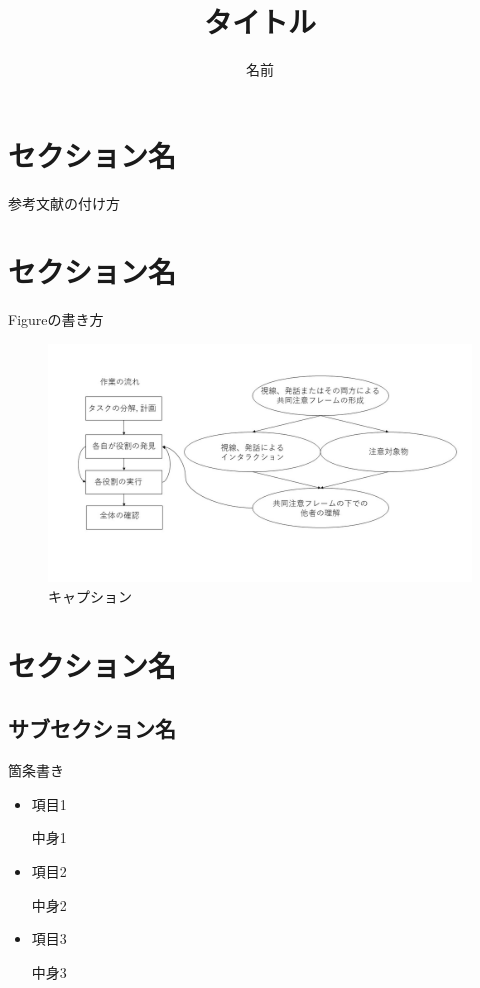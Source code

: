 \documentclass[11pt, a4paper]{jarticle}
\title{タイトル}
\author{名前}
\begin{document}
\maketitle

\section{セクション名} %
	参考文献の付け方\cite{キー名}


\section{セクション名} %
	Figureの書き方

	\begin{figure}[htbp]
		\begin{center}
			\includegraphics[width = 13.0cm]{../figure/fileName.jpg}
			\caption{キャプション}
		\end{center}
	\end{figure}


\section{セクション名}
	\subsection{サブセクション名}
		箇条書き

		\begin{itemize}
		\item{項目1} \par
		中身1
		\item{項目2}　\par
		中身2
		\item{項目3} \par
		中身3
		\end{itemize}
\end{document}
